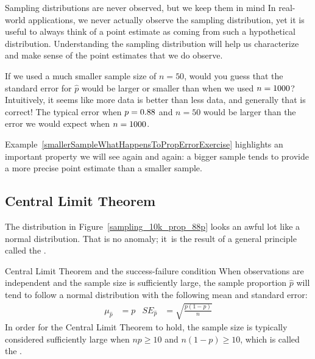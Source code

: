 \begin{onebox}{Sampling distributions are
    never observed, but we keep them in mind}
  In real-world applications, we never actually observe the
  sampling distribution, yet it is useful to always think of
  a point estimate as coming from such a hypothetical
  distribution.
  \mbox{Understanding} the sampling distribution will help us
  characterize and make sense of the point estimates that we
  do observe.
\end{onebox}

\begin{examplewrap}
\begin{nexample}{If we used a much smaller sample size of $n = 50$,
would you guess that the standard error for $\hat{p}$ would be larger
or smaller than when we used $n = 1000{}$?}
\label{smallerSampleWhatHappensToPropErrorExercise}
Intuitively, it seems like more data is better
than less data, and generally that is correct! The typical error
when $p = 0.88{}$ and $n = 50$ would be larger
than the error we would expect when $n = 1000{}$.
\end{nexample}
\end{examplewrap}

Example~\ref{smallerSampleWhatHappensToPropErrorExercise}
highlights an important property we will see again and again:
a bigger sample tends to provide a more precise point estimate
than a smaller sample.



\subsection{Central Limit Theorem}

The distribution in
Figure~\ref{sampling_10k_prop_88p} looks an awful lot like
a normal distribution. That is no anomaly; it~is the result
of a general principle called the
.

\begin{onebox}{Central Limit Theorem and the success-failure condition}
  When observations are independent and the sample size is
  sufficiently large, the sample proportion $\hat{p}$ will tend
  to follow a normal distribution with the following mean and
  standard error:%
  \begin{align*}
    \mu_{\hat{p}} &= p
    &SE_{\hat{p}} &= \sqrt{\frac{p (1 - p)}{n}}
  \end{align*}
  In order for the Central Limit Theorem to hold,
  the sample size is typically considered sufficiently large
  when $np \geq 10$ and $n(1-p) \geq 10$, which is called the
  .
\end{onebox}

